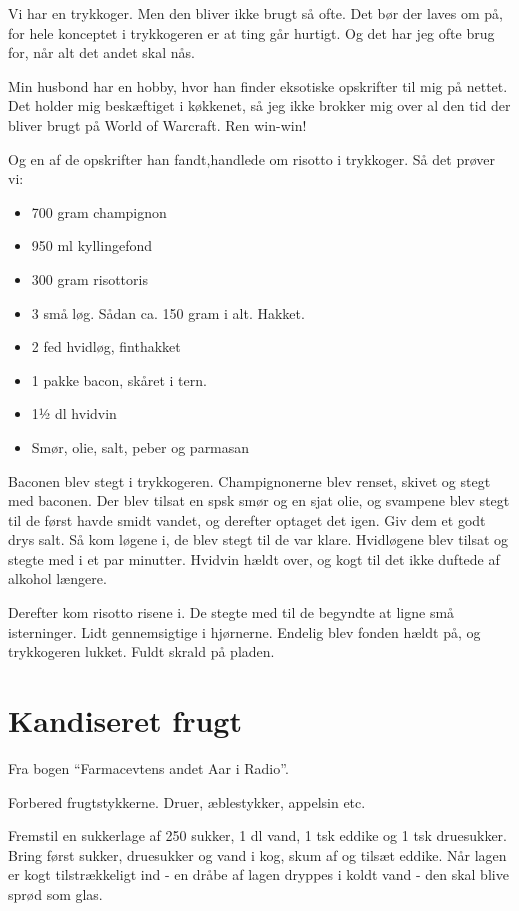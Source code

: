\documentclass[
  letterpaper,
  DIV=11,
  numbers=noendperiod]{scrreprt}
\providecommand{\tightlist}{%
  \setlength{\itemsep}{0pt}\setlength{\parskip}{0pt}}\usepackage{longtable,booktabs,array}
\begin{document}
Vi har en trykkoger. Men den bliver ikke brugt så ofte. Det bør der
laves om på, for hele konceptet i trykkogeren er at ting går hurtigt. Og
det har jeg ofte brug for, når alt det andet skal nås.

Min husbond har en hobby, hvor han finder eksotiske opskrifter til mig
på nettet. Det holder mig beskæftiget i køkkenet, så jeg ikke brokker
mig over al den tid der bliver brugt på World of Warcraft. Ren win-win!

Og en af de opskrifter han fandt,handlede om risotto i trykkoger. Så det
prøver vi:

\begin{itemize}
\tightlist
\item
  700 gram champignon
\item
  950 ml kyllingefond
\item
  300 gram risottoris
\item
  3 små løg. Sådan ca. 150 gram i alt. Hakket.
\item
  2 fed hvidløg, finthakket
\item
  1 pakke bacon, skåret i tern.
\item
  1½ dl hvidvin
\item
  Smør, olie, salt, peber og parmasan
\end{itemize}

Baconen blev stegt i trykkogeren. Champignonerne blev renset, skivet og
stegt med baconen. Der blev tilsat en spsk smør og en sjat olie, og
svampene blev stegt til de først havde smidt vandet, og derefter optaget
det igen. Giv dem et godt drys salt. Så kom løgene i, de blev stegt til
de var klare. Hvidløgene blev tilsat og stegte med i et par minutter.
Hvidvin hældt over, og kogt til det ikke duftede af alkohol længere.

Derefter kom risotto risene i. De stegte med til de begyndte at ligne
små isterninger. Lidt gennemsigtige i hjørnerne. Endelig blev fonden
hældt på, og trykkogeren lukket. Fuldt skrald på pladen.

\hypertarget{kandiseret-frugt}{%
\section{Kandiseret frugt}\label{kandiseret-frugt}}

Fra bogen ``Farmacevtens andet Aar i Radio''.

Forbered frugtstykkerne. Druer, æblestykker, appelsin etc.

Fremstil en sukkerlage af 250 sukker, 1 dl vand, 1 tsk eddike og 1 tsk
druesukker. Bring først sukker, druesukker og vand i kog, skum af og
tilsæt eddike. Når lagen er kogt tilstrækkeligt ind - en dråbe af lagen
dryppes i koldt vand - den skal blive sprød som glas.
\end{document}
